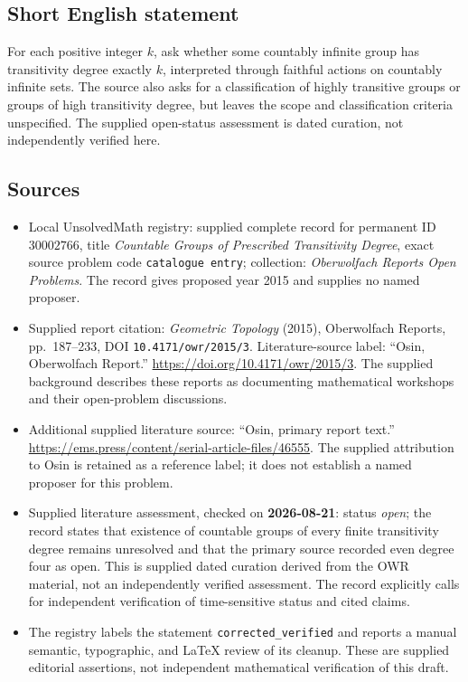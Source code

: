 \documentclass[11pt]{article}
\begin{document}
\subsection{Short English statement}
For each positive integer \(k\), ask whether some countably infinite group has transitivity degree exactly \(k\), interpreted through faithful actions on countably infinite sets. The source also asks for a classification of highly transitive groups or groups of high transitivity degree, but leaves the scope and classification criteria unspecified. The supplied open-status assessment is dated curation, not independently verified here.
\subsection{Sources}
\begin{itemize}
\item Local UnsolvedMath registry: supplied complete record for permanent ID \(30002766\), title \emph{Countable Groups of Prescribed Transitivity Degree}, exact source problem code \texttt{catalogue entry}; collection: \emph{Oberwolfach Reports Open Problems}. The record gives proposed year 2015 and supplies no named proposer.
\item Supplied report citation: \emph{Geometric Topology} (2015), Oberwolfach Reports, pp.~187--233, DOI \texttt{10.4171/owr/2015/3}. Literature-source label: ``Osin, Oberwolfach Report.'' \url{https://doi.org/10.4171/owr/2015/3}. The supplied background describes these reports as documenting mathematical workshops and their open-problem discussions.
\item Additional supplied literature source: ``Osin, primary report text.'' \url{https://ems.press/content/serial-article-files/46555}. The supplied attribution to Osin is retained as a reference label; it does not establish a named proposer for this problem.
\item Supplied literature assessment, checked on \textbf{2026-08-21}: status \emph{open}; the record states that existence of countable groups of every finite transitivity degree remains unresolved and that the primary source recorded even degree four as open. This is supplied dated curation derived from the OWR material, not an independently verified assessment. The record explicitly calls for independent verification of time-sensitive status and cited claims.
\item The registry labels the statement \texttt{corrected\_verified} and reports a manual semantic, typographic, and LaTeX review of its cleanup. These are supplied editorial assertions, not independent mathematical verification of this draft.
\end{itemize}
\end{document}
